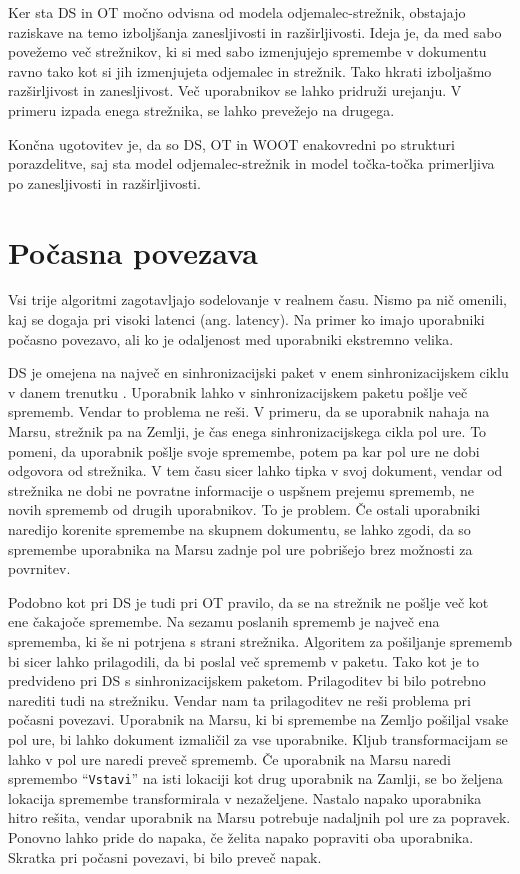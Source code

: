 \documentclass[a4paper, 12pt, twoside]{book}
\begin{document}
Ker sta DS in OT močno odvisna od modela odjemalec-strežnik, obstajajo raziskave \cite{diffsync} na temo izboljšanja zanesljivosti in razširljivosti. Ideja je, da med sabo povežemo več strežnikov, ki si med sabo izmenjujejo spremembe v dokumentu ravno tako kot si jih izmenjujeta odjemalec in strežnik. Tako hkrati izboljašmo razširljivost in zanesljivost. Več uporabnikov se lahko pridruži urejanju. V primeru izpada enega strežnika, se lahko prevežejo na drugega.

Končna ugotovitev je, da so DS, OT in WOOT enakovredni po strukturi porazdelitve, saj sta model odjemalec-strežnik in model točka-točka primerljiva po zanesljivosti in razširljivosti.

\section{Počasna povezava}

Vsi trije algoritmi zagotavljajo sodelovanje v realnem času. Nismo pa nič omenili, kaj se dogaja pri visoki latenci (ang. latency). Na primer ko imajo uporabniki počasno povezavo, ali ko je odaljenost med uporabniki ekstremno velika.

DS je omejena na največ en sinhronizacijski paket v enem sinhronizacijskem ciklu v danem trenutku \cite{diffsync}. Uporabnik lahko v sinhronizacijskem paketu pošlje več sprememb. Vendar to problema ne reši. V primeru, da se uporabnik nahaja na Marsu, strežnik pa na Zemlji, je čas enega sinhronizacijskega cikla pol ure. To pomeni, da uporabnik pošlje svoje spremembe, potem pa kar pol ure ne dobi odgovora od strežnika. V tem času sicer lahko tipka v svoj dokument, vendar od strežnika ne dobi ne povratne informacije o uspšnem prejemu sprememb, ne novih sprememb od drugih uporabnikov. To je problem. Če ostali uporabniki naredijo korenite spremembe na skupnem dokumentu, se lahko zgodi, da so spremembe uporabnika na Marsu zadnje pol ure pobrišejo brez možnosti za povrnitev.

Podobno kot pri DS je tudi pri OT pravilo, da se na strežnik ne pošlje več kot ene čakajoče spremembe. Na sezamu poslanih sprememb je največ ena sprememba, ki še ni potrjena s strani strežnika. Algoritem za pošiljanje sprememb bi sicer lahko prilagodili, da bi poslal več sprememb v paketu. Tako kot je to predvideno pri DS s sinhronizacijskem paketom. Prilagoditev bi bilo potrebno narediti tudi na strežniku. Vendar nam ta prilagoditev ne reši problema pri počasni povezavi. Uporabnik na Marsu, ki bi spremembe na Zemljo pošiljal vsake pol ure, bi lahko dokument izmaličil za vse uporabnike. Kljub transformacijam se lahko v pol ure naredi preveč sprememb. Če uporabnik na Marsu naredi spremembo “{\tt Vstavi}” na isti lokaciji kot drug uporabnik na Zamlji, se bo željena lokacija spremembe transformirala v nezaželjene. Nastalo napako uporabnika hitro rešita, vendar uporabnik na Marsu potrebuje nadaljnih pol ure za popravek. Ponovno lahko pride do napaka, če želita napako popraviti oba uporabnika. Skratka pri počasni povezavi, bi bilo preveč napak.
\end{document}
